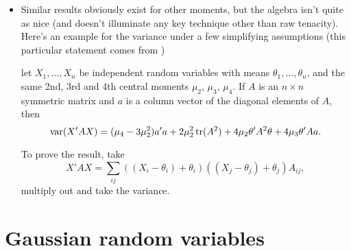 \begin{itemize}[leftmargin=0pt]
\item Similar results obviously exist for other moments, but the
  algebra isn't quite as nice (and doesn't illuminate any key
  technique other than raw tenacity).  Here's an example for the
  variance under a few simplifying assumptions (this particular
  statement comes from \citealp{SL03})
  \begin{thm}
    let $X_1,...,X_n$ be independent random variables with means
    $\theta_1,...,\theta_n$, and the same 2nd, 3rd and 4th central
    moments $\mu_2$, $\mu_3$, $\mu_4$.  If $A$ is an $n \times n$
    symmetric matrix and $a$ is a column vector of the diagonal
    elements of $A$, then
    \begin{equation*}
      \operatorname{var}(X'AX) = 
      (\mu_4 - 3 \mu_2^2)a'a + 2 \mu_2^2 \operatorname{tr}(A^2) + 4 \mu_2 \theta'A^2 \theta + 4 \mu_3 \theta' A a.
    \end{equation*}
  \end{thm}
  To prove the result, take
  \begin{equation*}
    X'A X = \sum_{ij} ((X_i - \theta_i) + \theta_i) ((X_j - \theta_j) + \theta_j) A_{ij},
  \end{equation*}
  multiply out and take the variance.

\end{itemize}

\section{Gaussian random variables}

